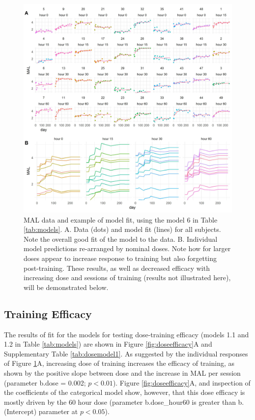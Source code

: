\begin{figure}
	\centering
	\includegraphics[width=\linewidth]{figures/doseBest}
	\caption[MAL data and example of model fit, using the model 6 in Table \ref{tab:models}.]{
		MAL data and example of model fit, using the model 6 in Table \ref{tab:models}. 
		A. Data (dots) and model fit (lines) for all subjects. Note the overall good fit of the model to the data. 
		B. Individual model predictions re-arranged by nominal doses. Note how for larger doses appear to increase response to training but also forgetting post-training. These results, as well as decreased efficacy with increasing dose and sessions of training (results not illustrated here), will be demonstrated below.}
	\label{fig:dosebest}
\end{figure}


\subsection{Training Efficacy}
The results of fit for the models for testing dose-training efficacy (models 1.1 and 1.2 in Table \ref{tab:models}) are shown in Figure \ref{fig:doseefficacy}A and Supplementary Table \ref{tab:dosemodel1}. 
As suggested by the individual responses of Figure \ref{fig:dosebest}A, increasing dose of training increases the efficacy of training, as shown by the positive slope between dose and the increase in MAL per session (parameter b.dose = 0.002; $ p < 0.01 $). 
Figure \ref{fig:doseefficacy}A, and inspection of the coefficients of the categorical model show, however, that this dose efficacy is mostly driven by the 60 hour dose (parameter b.dose\_hour60 is greater than b.(Intercept) parameter at $ p < 0.05 $).

